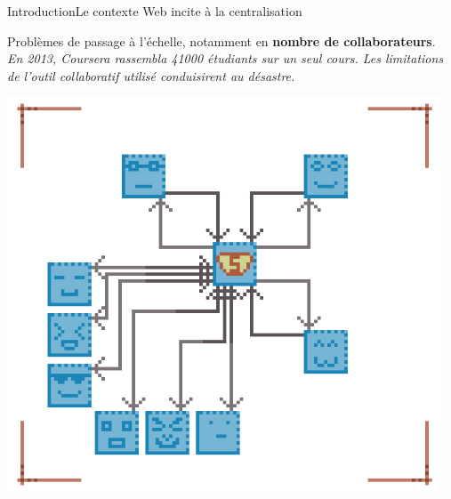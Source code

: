 \begin{frame}{Introduction}{Le contexte Web incite à la centralisation}
  \begin{minipage}{0.69\textwidth}
    Problèmes de passage à l'échelle, notamment en \textbf{nombre de
      collaborateurs}. \vspace{0.15cm}\\
    \textit{En 2013, Coursera rassembla 41000 étudiants sur un seul cours.  Les
      limitations de l'outil collaboratif utilisé conduisirent au \og
      désastre\fg.}%
  \end{minipage}
  \hfill
  \begin{minipage}{0.3\textwidth}
    \hfill
    \includegraphics[width=0.97\textwidth]{img/centralizedcpuproblems.png}
  \end{minipage}


\end{frame}
